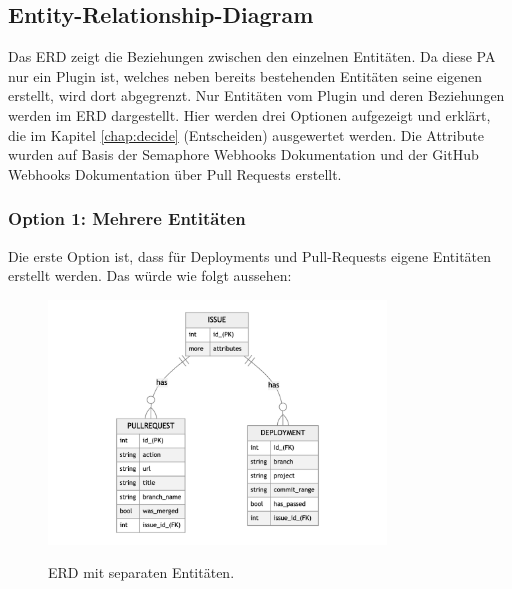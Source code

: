 \subsection{Entity-Relationship-Diagram}
Das ERD zeigt die Beziehungen zwischen den einzelnen Entitäten. Da diese PA nur ein Plugin ist, welches neben
bereits bestehenden Entitäten seine eigenen erstellt, wird dort abgegrenzt. Nur Entitäten vom Plugin und
deren Beziehungen werden im ERD dargestellt. \newline
Hier werden drei Optionen aufgezeigt und erklärt, die im Kapitel \ref{chap:decide} (Entscheiden) ausgewertet werden. \newline
Die Attribute wurden auf Basis der Semaphore Webhooks Dokumentation \cite{semaphore_webhooks} und der GitHub Webhooks
Dokumentation über Pull Requests \cite{github_webhooks_pr} erstellt.

\subsubsection{Option 1: Mehrere Entitäten}
Die erste Option ist, dass für Deployments und Pull-Requests eigene Entitäten erstellt werden. Das würde wie folgt aussehen:
\begin{figure}[H]
  \centering
  \includegraphics[width=0.8\textwidth]{images/erd/multiple.png}
  \label{fig:erd_multiple}
  \caption[Ein ERD, welches eine separate Entität für Deployments und Pull-Requests aufzeigt.]{ERD mit separaten Entitäten.}
\end{figure}

